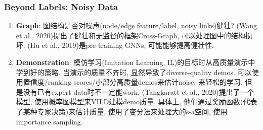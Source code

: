 \documentclass{beamer}
\newcommand{\bt}[1]{\textbf{#1}}
\begin{document}
\begin{frame}
    \frametitle{Beyond Labels: Noisy Data}

    \begin{enumerate}
        \item \bt{Graph}: 图结构是否对噪声(node/edge feature/label, noisy links)健壮? (Wang  et  al., 2020)提出了健壮和无监督的框架Cross-Graph, 可以处理图中的结构损坏. (Hu et al., 2019)是pre-training GNNs, 可能能够提高健壮性.
        \item \bt{Demonstration}: 模仿学习(Imitation Learning, IL)的目标时从高质量演示中学到好的策略. 当演示的质量不齐时, 显然导致了diverse-quality demos. 可以使用置信度/ranking scores/小部分高质量demos来估计noise, 来轻松的学习. 但是没有已有expert data时不一定能work. (Tangkaratt et al., 2020)提出了一个模型, 使用概率图模型来VILD建模demo质量. 具体上, 他们通过奖励函数(代表了某种专家决策)来估计质量, 使用了变分法来处理大的s-a空间, 使用importance sampling.
    \end{enumerate}

\end{frame}
\end{document}
